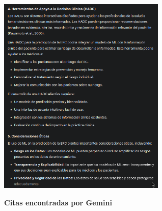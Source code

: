 \documentclass{article}
\begin{document}
\begin{center}
    \includegraphics[width=0.6\textwidth]{../gemini_marco_4.png}\\
\end{center}
\textbf{Citas encontradas por Gemini}
\end{document}
